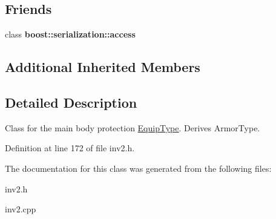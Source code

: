 \subsection*{Friends}
\begin{DoxyCompactItemize}
\item 
\hypertarget{class_cuirass_ac98d07dd8f7b70e16ccb9a01abf56b9c}{}\label{class_cuirass_ac98d07dd8f7b70e16ccb9a01abf56b9c} 
class {\bfseries boost\+::serialization\+::access}
\end{DoxyCompactItemize}
\subsection*{Additional Inherited Members}


\subsection{Detailed Description}
Class for the main body protection \hyperlink{class_equip_type}{Equip\+Type}. Derives Armor\+Type. 

Definition at line 172 of file inv2.\+h.



The documentation for this class was generated from the following files\+:\begin{DoxyCompactItemize}
\item 
inv2.\+h\item 
inv2.\+cpp\end{DoxyCompactItemize}
